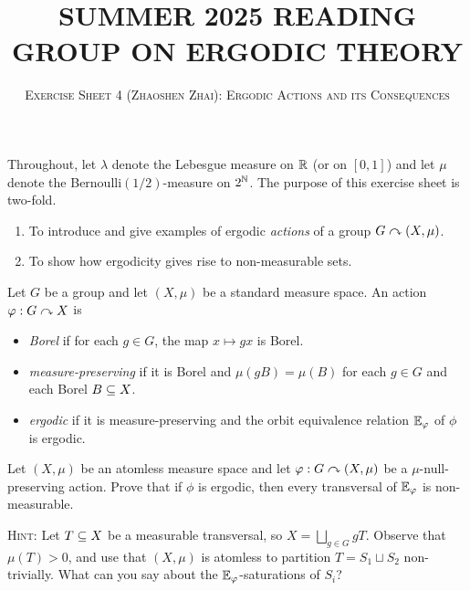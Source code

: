 \documentclass[reqno, twoside]{article}
\begin{document}
    \title{\textbf{\normalsize\MakeUppercase{Summer 2025 Reading Group on Ergodic Theory}}}
    \author{\normalsize\textsc{Exercise Sheet 4 (Zhaoshen Zhai): Ergodic Actions and its Consequences}}
    \date{}
    \maketitle

    Throughout, let $\lambda$ denote the Lebesgue measure on $\mathbb{R}$ (or on $[0,1]$) and let $\mu$ denote the Bernoulli$(1/2)$-measure on $2^{\mathbb{N}}$. The purpose of this exercise sheet is two-fold.
    \begin{enumerate}
        \item To introduce and give examples of ergodic \textit{actions} of a group $G\curvearrowright(X,\mu)$.
            \vspace{-0.05in}
        \item To show how ergodicity gives rise to non-measurable sets.
    \end{enumerate}

    \begin{definition*}
        Let $G$ be a group and let $(X,\mu)$ be a standard measure space. An action $\varphi:G\curvearrowright X$ is
        \begin{itemize}
            \item \textit{Borel} if for each $g\in G$, the map $x\mapsto gx$ is Borel.
                \vspace{-0.05in}
            \item \textit{measure-preserving} if it is Borel and $\mu(gB)=\mu(B)$ for each $g\in G$ and each Borel $B\subseteq X$.
                \vspace{-0.05in}
            \item \textit{ergodic} if it is measure-preserving and the orbit equivalence relation $\mathbb{E}_\varphi$ of $\phi$ is ergodic.
        \end{itemize}
    \end{definition*}

    \begin{exercise}\label{1}
        Let $(X,\mu)$ be an atomless measure space and let $\varphi:G\curvearrowright(X,\mu)$ be a $\mu$-null-preserving action. Prove that if $\phi$ is ergodic, then every transversal of $\mathbb{E}_\varphi$ is non-measurable.

        \textsc{Hint}: Let $T\subseteq X$ be a measurable transversal, so $X=\bigsqcup_{g\in G}gT$. Observe that $\mu(T)>0$, and use that $(X,\mu)$ is atomless to partition $T=S_1\sqcup S_2$ non-trivially. What can you say about the $\mathbb{E}_\varphi$-saturations of $S_i$?
    \end{exercise}
\end{document}
